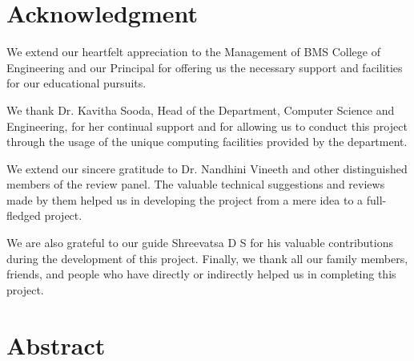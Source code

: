 \documentclass[12pt,a4paper]{report}
\newcommand{\guide}{Shreevatsa D S}
\begin{document}
\chapter*{Acknowledgment}
\thispagestyle{empty}
We extend our heartfelt appreciation to the Management of BMS College of Engineering and our Principal for offering us the necessary support and facilities for our educational pursuits.

We thank Dr. Kavitha Sooda, Head of the Department, Computer Science and Engineering, for her continual support and for allowing us to conduct this project through the usage of the unique computing facilities provided by the department.

We extend our sincere gratitude to Dr. Nandhini Vineeth and other distinguished members of the review panel. The valuable technical suggestions and reviews made by them helped us in developing the project from a mere idea to a full-fledged project.

We are also grateful to our guide \guide { }for his valuable contributions during the development of this project.
Finally, we thank all our family members, friends, and people who have directly or indirectly helped us in completing this project.
\newpage


\tableofcontents
\thispagestyle{empty}
\newpage
\listoffigures
\thispagestyle{empty}
\newpage
\listoftables
\thispagestyle{empty}

\chapter*{Abstract}
\thispagestyle{empty}



\clearpage
{}
\setcounter{page}{1}











%
	
\end{document}
